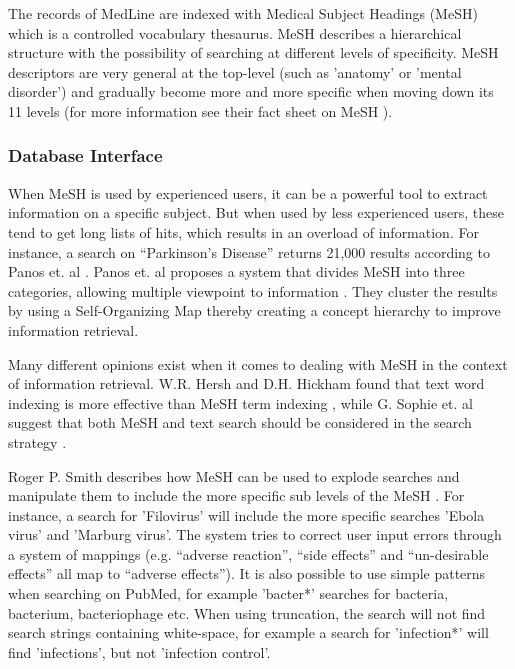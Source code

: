 The records of MedLine are indexed with Medical Subject Headings
(MeSH) which is a controlled vocabulary thesaurus. MeSH describes a
hierarchical structure with the possibility of searching at different
levels of specificity. MeSH descriptors are very general at the
top-level (such as 'anatomy' or 'mental disorder') and gradually
become more and more specific when moving down its 11 levels (for
more information see their fact sheet on MeSH \cite{FactSheetMeSH}).

\subsubsection{Database Interface}
When MeSH is used by experienced users, it can be a powerful tool to
extract information on a specific subject. But when used by less
experienced users, these tend to get long lists of hits, which results
in an overload of information. For instance, a search on ``Parkinson's
Disease'' returns 21,000 results according to Panos et. al
\cite{DataMiningBiomedicine}. Panos et. al proposes a system that
divides MeSH into three categories, allowing multiple viewpoint  to
information \cite{DataMiningBiomedicine}. They cluster the results by
using a Self-Organizing Map thereby creating a concept hierarchy to
improve information retrieval.

Many different opinions exist when it comes to dealing with
MeSH in the context of information retrieval. W.R. Hersh and
D.H. Hickham found that text word indexing is more effective than MeSH
term indexing \cite{RetrievalEffectiveness}, while G. Sophie et. al
suggest that both MeSH and text search should be considered in the
search strategy \cite{FDGPET}.

Roger P. Smith describes how MeSH can be used to explode searches and
manipulate them to include the more specific sub levels of the
MeSH \cite{TheInternetforPhysicians}. For instance, a search for 'Filovirus' will include the more
specific searches 'Ebola virus' and 'Marburg virus'. The system tries
to correct user input errors through a system of mappings
(e.g. ``adverse reaction'', ``side effects'' and ``un-desirable
effects'' all map to ``adverse effects''). It is also possible to use
simple patterns when searching on PubMed, for example 'bacter*'
searches for bacteria, bacterium, bacteriophage etc. When using
truncation, the search will not find search strings containing
white-space, for example a search for 'infection*' will find
'infections', but not 'infection control'.

